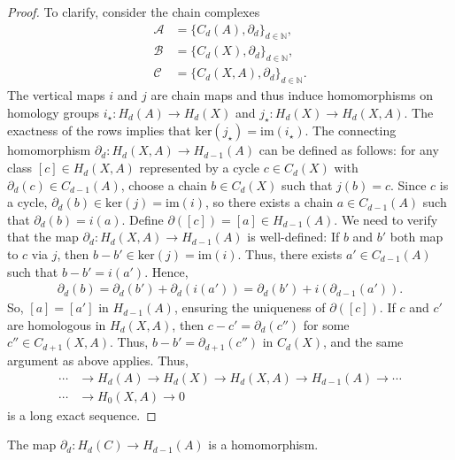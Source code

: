 \begin{proof}
	To clarify, consider the chain complexes
	\begin{align}
		\mathcal{A} & = \{C_{d}(A), \partial_{d}\}_{d \in \mathbb{N}}, \nonumber\\
		\mathcal{B} & = \{C_{d}(X), \partial_{d}\}_{d \in \mathbb{N}}, \nonumber\\
		\mathcal{C} & = \{C_{d}(X, A), \partial_{d}\}_{d \in \mathbb{N}}. 
	\end{align}
	The vertical maps \(i\) and \(j\) are chain maps and thus induce homomorphisms on homology groups \(i_{\star}: H_{d}(A) \rightarrow H_{d}(X)\) and \(j_{\star}: H_{d}(X) \rightarrow H_{d}(X, A)\). The exactness of the rows implies that \(\mathrm{ker}(j_{\star}) = \mathrm{im}(i_{\star})\). The connecting homomorphism \(\partial_d: H_{d}(X, A) \rightarrow H_{d-1}(A)\) can be defined as follows: for any class \([c] \in H_{d}(X, A)\) represented by a cycle \(c \in C_{d}(X)\) with \(\partial_{d}(c) \in C_{d-1}(A)\), choose a chain \(b \in C_{d}(X)\) such that \(j(b) = c\). Since \(c\) is a cycle, \(\partial_{d}(b) \in \mathrm{ker}(j) = \mathrm{im}(i)\), so there exists a chain \(a \in C_{d-1}(A)\) such that \(\partial_{d}(b) = i(a)\). Define \(\partial([c]) = [a] \in H_{d-1}(A)\). We need to verify that the map \(\partial_d: H_{d}(X, A) \rightarrow H_{d-1}(A)\) is well-defined: If \(b\) and \(b'\) both map to \(c\) via \(j\), then \(b - b' \in \mathrm{ker}(j) = \mathrm{im}(i)\). Thus, there exists \(a' \in C_{d-1}(A)\) such that \(b - b' = i(a')\). Hence,
	\begin{align}
		\partial_{d}(b) = \partial_{d}(b') + \partial_{d}(i(a')) = \partial_{d}(b') + i(\partial_{d-1}(a')). 
	\end{align}
	So, \([a] = [a']\) in \(H_{d-1}(A)\), ensuring the uniqueness of \(\partial([c])\). If \(c\) and \(c'\) are homologous in \(H_{d}(X, A)\), then \(c - c' = \partial_{d}(c'')\) for some \(c'' \in C_{d+1}(X, A)\). Thus, \(b - b' = \partial_{d+1}(c'')\) in \(C_{d}(X)\), and the same argument as above applies. Thus,
	\begin{align}
		\cdots &\rightarrow H_{d}(A) \rightarrow H_{d}(X) \rightarrow H_{d}(X, A) \rightarrow H_{d-1}(A) \rightarrow \cdots \nonumber\\
		\cdots &\rightarrow H_{0}(X, A) \rightarrow 0                                                                    
	\end{align}
	is a long exact sequence.
\end{proof}

\begin{proposition}
	The map \(\partial_{d}: H_{d}(C) \rightarrow H_{d-1}(A)\) is a homomorphism.
\end{proposition}

